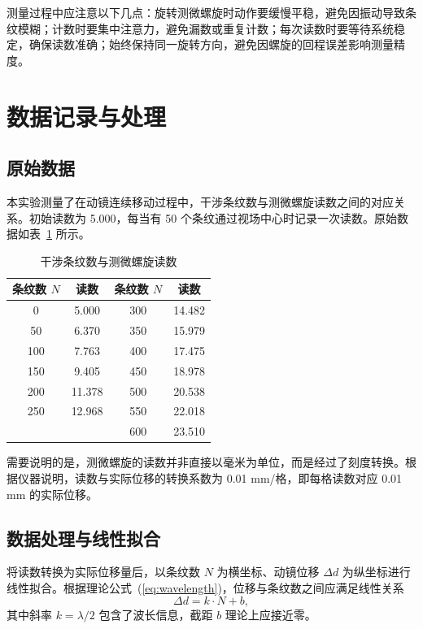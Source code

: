 ﻿\documentclass[12pt,a4paper]{article}
\begin{document}
测量过程中应注意以下几点：旋转测微螺旋时动作要缓慢平稳，避免因振动导致条纹模糊；计数时要集中注意力，避免漏数或重复计数；每次读数时要等待系统稳定，确保读数准确；始终保持同一旋转方向，避免因螺旋的回程误差影响测量精度。

\section{数据记录与处理}

\subsection{原始数据}

本实验测量了在动镜连续移动过程中，干涉条纹数与测微螺旋读数之间的对应关系。初始读数为 5.000，每当有 50 个条纹通过视场中心时记录一次读数。原始数据如表~\ref{tab:raw_data} 所示。

\begin{table}[H]
\centering
\caption{干涉条纹数与测微螺旋读数}
\label{tab:raw_data}
\begin{tabular}{|c|c|c|c|}
\hline
\textbf{条纹数 $N$} & \textbf{读数} & \textbf{条纹数 $N$} & \textbf{读数} \\
\hline
0   & 5.000  & 300 & 14.482 \\
\hline
50  & 6.370  & 350 & 15.979 \\
\hline
100 & 7.763  & 400 & 17.475 \\
\hline
150 & 9.405  & 450 & 18.978 \\
\hline
200 & 11.378 & 500 & 20.538 \\
\hline
250 & 12.968 & 550 & 22.018 \\
\hline
&  & 600 & 23.510 \\
\hline
\end{tabular}
\end{table}

需要说明的是，测微螺旋的读数并非直接以毫米为单位，而是经过了刻度转换。根据仪器说明，读数与实际位移的转换系数为 0.01 mm/格，即每格读数对应 0.01 mm 的实际位移。

\subsection{数据处理与线性拟合}

将读数转换为实际位移量后，以条纹数 $N$ 为横坐标、动镜位移 $\Delta d$ 为纵坐标进行线性拟合。根据理论公式~(\ref{eq:wavelength})，位移与条纹数之间应满足线性关系
\begin{equation}
\Delta d = k \cdot N + b,
\end{equation}
其中斜率 $k = \lambda / 2$ 包含了波长信息，截距 $b$ 理论上应接近零。
\end{document}

